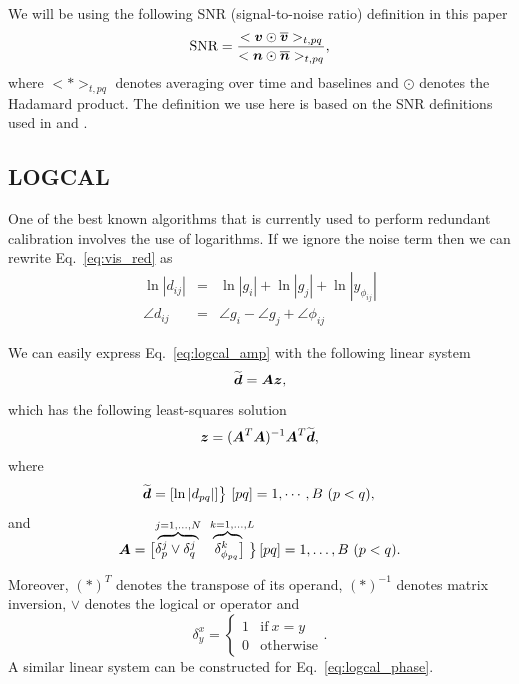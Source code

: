 \documentclass[useAMS,usenatbib]{mn2e}
\newcommand{\bz}{\bmath{z}}
\newcommand{\bA}{\bmath{A}}
\newcommand{\bd}{\bmath{d}}
\newcommand{\bv}{\bmath{v}}
\newcommand{\bn}{\bmath{n}}
\newcommand{\conj}[1]{\overline{#1}}
\newcommand\coolover[2]{\mathrlap{\smash{\overbrace{\phantom{%
    \begin{matrix} #2 \end{matrix}}}^{\mbox{$#1$}}}}#2}
\newcommand\coolrightbrace[2]{%
\left.\vphantom{\begin{matrix} #1 \end{matrix}}\right\}#2}
\begin{document}
We will be using the following SNR (signal-to-noise ratio) definition in this paper  
\begin{equation}
\textrm{SNR} = \frac{<\bv\odot\conj{\bv}>_{t,pq}}{<\bn\odot\conj{\bn}>_{t,pq}}, 
\end{equation}
where $<*>_{t,pq}$ denotes averaging over time and baselines and $\odot$ denotes the Hadamard product. The definition we use here is based on the SNR definitions used in \citet{Liu2010} and \citet{Marthi2014}.

\subsection{LOGCAL}
One of the best known algorithms that is currently used to perform redundant calibration involves the use of logarithms. If we ignore the noise term then we can 
rewrite Eq.~\eqref{eq:vis_red} as
\begin{eqnarray}
\ln |d_{ij}| &=& \ln |g_i| + \ln |g_j| + \ln |y_{\phi_{ij}}| \label{eq:logcal_amp}\\
\angle d_{ij} &=& \angle g_i - \angle g_j + \angle \phi_{ij} \label{eq:logcal_phase}
\end{eqnarray}

We can easily express Eq.~\eqref{eq:logcal_amp} with the following linear system
\begin{equation}
\widetilde{\bd} = \bA\bz, 
\end{equation}
which has the following least-squares solution
\begin{equation}
\bz = (\bA^T\bA)^{-1}\bA^T\widetilde{\bd},
\end{equation}
where
\begin{equation}
\widetilde{\bd} = [\ln |d_{pq}|] \big \} ~ [pq] = 1,\cdots,B ~ (p<q),\nonumber\\ 
\end{equation}
and
\begin{equation}
\bA = 
\begin{bmatrix}
\coolover{{\scriptstyle j=1,\ldots,N}}{\delta^j_p\vee\delta^j_q} & \coolover{{\scriptstyle k=1,\ldots,L}\!\!\!\!}{~\delta_{\phi_{pq}}^k}
\end{bmatrix}
\begin{matrix}%
\coolrightbrace{\delta_{\phi_{pq}}^k}{[pq] = 1,\ldots,B~(p<q)}
\end{matrix}.
\end{equation}

Moreover, $(*)^T$ denotes the transpose of its operand, $(*)^{-1}$ denotes matrix inversion, $\vee$ denotes the logical or operator and
\begin{equation}
\delta_y^x  = \begin{cases}
          1 & \textrm{if}~x=y\\
          0 & \textrm{otherwise}
         \end{cases}.
\end{equation}
A similar linear system can be constructed for Eq.~\eqref{eq:logcal_phase}.
\end{document}
